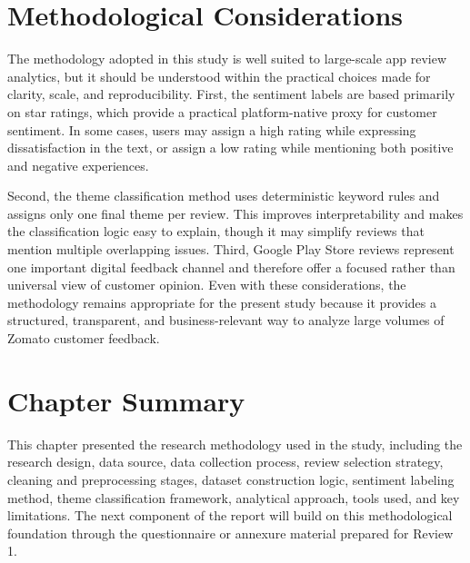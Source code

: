 \section{Methodological Considerations}

The methodology adopted in this study is well suited to large-scale app review analytics, but it should be understood within the practical choices made for clarity, scale, and reproducibility. First, the sentiment labels are based primarily on star ratings, which provide a practical platform-native proxy for customer sentiment. In some cases, users may assign a high rating while expressing dissatisfaction in the text, or assign a low rating while mentioning both positive and negative experiences.

Second, the theme classification method uses deterministic keyword rules and assigns only one final theme per review. This improves interpretability and makes the classification logic easy to explain, though it may simplify reviews that mention multiple overlapping issues. Third, Google Play Store reviews represent one important digital feedback channel and therefore offer a focused rather than universal view of customer opinion. Even with these considerations, the methodology remains appropriate for the present study because it provides a structured, transparent, and business-relevant way to analyze large volumes of Zomato customer feedback.

\section{Chapter Summary}

This chapter presented the research methodology used in the study, including the research design, data source, data collection process, review selection strategy, cleaning and preprocessing stages, dataset construction logic, sentiment labeling method, theme classification framework, analytical approach, tools used, and key limitations. The next component of the report will build on this methodological foundation through the questionnaire or annexure material prepared for Review 1.
